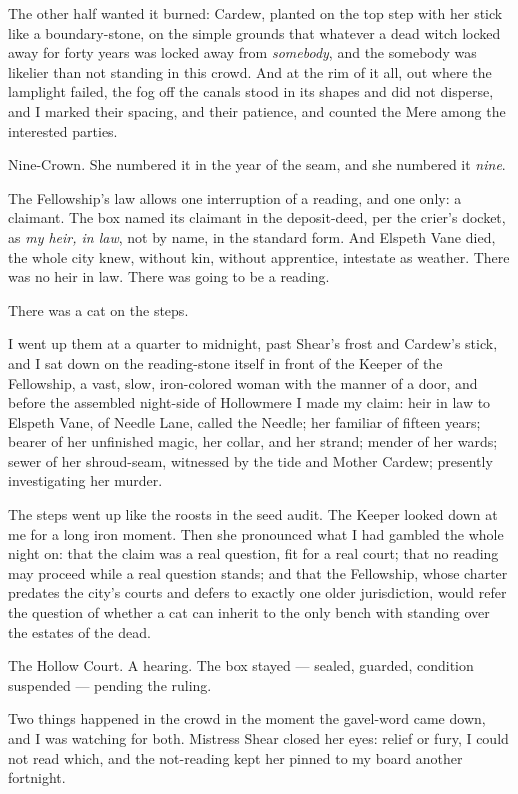 The other half wanted it burned: Cardew, planted on the top step with her stick like a boundary-stone, on the simple grounds that whatever a dead witch locked away for forty years was locked away from \emph{somebody}, and the somebody was likelier than not standing in this crowd. And at the rim of it all, out where the lamplight failed, the fog off the canals stood in its shapes and did not disperse, and I marked their spacing, and their patience, and counted the Mere among the interested parties.

Nine-Crown. She numbered it in the year of the seam, and she numbered it \emph{nine}.

The Fellowship's law allows one interruption of a reading, and one only: a claimant. The box named its claimant in the deposit-deed, per the crier's docket, as \emph{my heir, in law}, not by name, in the standard form. And Elspeth Vane died, the whole city knew, without kin, without apprentice, intestate as weather. There was no heir in law. There was going to be a reading.

There was a cat on the steps.

I went up them at a quarter to midnight, past Shear's frost and Cardew's stick, and I sat down on the reading-stone itself in front of the Keeper of the Fellowship, a vast, slow, iron-colored woman with the manner of a door, and before the assembled night-side of Hollowmere I made my claim: heir in law to Elspeth Vane, of Needle Lane, called the Needle; her familiar of fifteen years; bearer of her unfinished magic, her collar, and her strand; mender of her wards; sewer of her shroud-seam, witnessed by the tide and Mother Cardew; presently investigating her murder.

The steps went up like the roosts in the seed audit. The Keeper looked down at me for a long iron moment. Then she pronounced what I had gambled the whole night on: that the claim was a real question, fit for a real court; that no reading may proceed while a real question stands; and that the Fellowship, whose charter predates the city's courts and defers to exactly one older jurisdiction, would refer the question of whether a cat can inherit to the only bench with standing over the estates of the dead.

The Hollow Court. A hearing. The box stayed --- sealed, guarded, condition suspended --- pending the ruling.

Two things happened in the crowd in the moment the gavel-word came down, and I was watching for both. Mistress Shear closed her eyes: relief or fury, I could not read which, and the not-reading kept her pinned to my board another fortnight.

